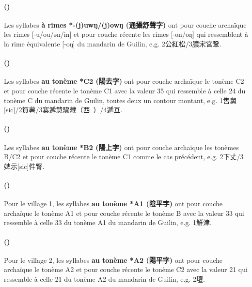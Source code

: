 \documentclass{scrbook}
\newcounter{c}[subsubsection]
\newcommand{\stpc}[1]{\stepcounter{#1}}
\newcommand{\termyyx}[1]{\textbf{#1}}
\begin{document}
\begin{sloppypar}
\stpc{c}\paragraph{()}
Les syllabes \termyyx{à rimes *-(j)uwŋ/(j)owŋ (通攝舒聲字)} ont pour couche archaïque les rimes [-u/ou/ən/in] et pour couche récente les rimes [-on/oŋ] qui ressemblent à la rime équivalente [-oŋ] du mandarin de Guilin, e.g. 2公紅松/3膿宋宮鞏.


\stpc{c}\paragraph{()}
Les syllabes \termyyx{au tonème *C2 (陽去字)} ont pour couche archaïque le tonème C2 et pour couche récente le tonème C1 avec la valeur 35 qui ressemble à celle 24 du tonème C du mandarin de Guilin, toutes deux un contour montant, e.g. 1售舅[sic]/2賀薯/3寨遞慧驟藏（西~）/4遞互.
	
\stpc{c}\paragraph{()}
Les syllabes \termyyx{au tonème *B2 (陽上字)} ont pour couche archaïque les tonèmes B/C2 et pour couche récente le tonème C1 comme le cas précédent, e.g. 2下丈/3婢示[sic]件腎.%
	
\stpc{c}\paragraph{()}
Pour le village 1, les syllabes \termyyx{au tonème *A1 (陰平字)} ont pour couche archaïque le tonème A1 et pour couche récente le tonème B avec la valeur 33 qui ressemble à celle 33 du tonème A1 du mandarin de Guilin, e.g. 1鮮津.
	
\stpc{c}\paragraph{()}
Pour le village 2, les syllabes \termyyx{au tonème *A2 (陽平字)} ont pour couche archaïque le tonème A2 et pour couche récente le tonème C2 avec la valeur 21 qui ressemble à celle 21 du tonème A2 du mandarin de Guilin, e.g. 2壇.


\end{sloppypar}
\end{document}
